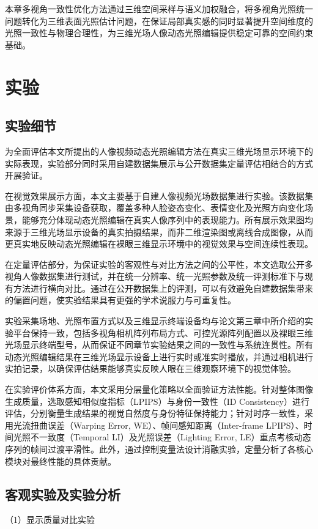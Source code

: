 本章多视角一致性优化方法通过三维空间采样与语义加权融合，将多视角光照统一问题转化为三维表面光照估计问题，在保证局部真实感的同时显著提升空间维度的光照一致性与物理合理性，为三维光场人像动态光照编辑提供稳定可靠的空间约束基础。

\section{实验}

\subsection{实验细节}
为全面评估本文所提出的人像视频动态光照编辑方法在真实三维光场显示环境下的实际表现，实验部分同时采用自建数据集展示与公开数据集定量评估相结合的方式开展验证。


在视觉效果展示方面，本文主要基于自建人像视频光场数据集进行实验。该数据集由多视角同步采集设备获取，覆盖多种人脸姿态变化、表情变化及光照方向变化场景，能够充分体现动态光照编辑在真实人像序列中的表现能力。所有展示效果图均来源于三维光场显示设备的真实拍摄结果，而非二维渲染图或离线合成图像，从而更真实地反映动态光照编辑在裸眼三维显示环境中的视觉效果与空间连续性表现。

在定量评估部分，为保证实验的客观性与对比方法之间的公平性，本文选取公开多视角人像数据集进行测试，并在统一分辨率、统一光照参数及统一评测标准下与现有方法进行横向对比。通过在公开数据集上的评测，可以有效避免自建数据集带来的偏置问题，使实验结果具有更强的学术说服力与可重复性。

实验采集场地、光照布置方式以及三维显示终端设备均与论文第三章中所介绍的实验平台保持一致，包括多视角相机阵列布局方式、可控光源阵列配置以及裸眼三维光场显示终端型号，从而保证不同章节实验结果之间的一致性与系统连贯性。所有动态光照编辑结果在三维光场显示设备上进行实时或准实时播放，并通过相机进行实拍记录，以确保评估结果能够真实反映人眼在三维观察环境下的视觉体验。

在实验评价体系方面，本文采用分层量化策略以全面验证方法性能。针对整体图像生成质量，选取感知相似度指标（LPIPS）与身份一致性（ID Consistency）进行评估，分别衡量生成结果的视觉自然度与身份特征保持能力；针对时序一致性，采用光流扭曲误差（Warping Error, WE）、帧间感知距离（Inter-frame LPIPS）、时间光照不一致度（Temporal LI）及光照误差（Lighting Error, LE）重点考核动态序列的帧间过渡平滑性。此外，通过控制变量法设计消融实验，定量分析了各核心模块对最终性能的具体贡献。

\subsection{客观实验及实验分析}
（1）显示质量对比实验

